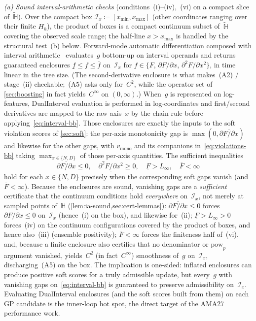 \documentclass[11pt]{article}
\newcommand{\calI}{\mathcal{I}}
\newcommand{\bbH}{\mathbb{H}}
\theoremstyle{plain}
\theoremstyle{remark}
\begin{document}
\smallskip\noindent
\emph{(a) Sound interval-arithmetic checks} (conditions~(i)--(iv),~(vi) on a compact slice of~$\widetilde{\bbH}$).
Over the compact box $\calI_x \coloneqq [x_{\min}, x_{\max}]$ (other coordinates ranging over their finite $H_h$), the product of boxes is a compact continuum subset of~$\widetilde{\bbH}$ covering the observed scale range; the half-line $x>x_{\max}$ is handled by the structural test~(b) below.
Forward-mode automatic differentiation composed with interval arithmetic~\citep{moore2009interval,kronberger2022shape} evaluates~$g$ bottom-up on interval operands and returns guaranteed enclosures
$\underline{f} \leq f \leq \overline{f}$ on~$\calI_x$ for $f \in \{F,\, \partial F/\partial x,\, \partial^2 F/\partial x^2\}$, in time linear in the tree size.
(The second-derivative enclosure is what makes~(A2) / stage~(ii) checkable;~(A5) asks only for~$C^2$, while the operator set of \cref{sec:boosting} in fact yields~$C^\infty$ on $(0,\infty)$.)
When~$g$ is represented on log-features, DualInterval evaluation is performed in log-coordinates and first/second derivatives are mapped to the raw axis~$x$ by the chain rule before applying~\eqref{eq:interval-bb}.
Those enclosures are exactly the inputs to the soft violation scores of \cref{sec:soft}: the per-axis monotonicity gap is $\max(0,\overline{\partial F/\partial x})$ and likewise for the other gaps, with $v_{\mathrm{mono}}$ and its companions in~\eqref{eq:violations-bb} taking $\max_{x\in\{N,D\}}$ of those per-axis quantities.
The sufficient inequalities
\begin{equation}\label{eq:interval-bb}
    \overline{\partial F / \partial x} \leq 0,
    \quad
    \underline{\partial^2 F / \partial x^2} \geq 0,
    \quad
    \underline{F} > L_\infty ,
    \quad
    \overline{F} < \infty
\end{equation}
hold for each $x \in \{N,D\}$ precisely when the corresponding soft gaps vanish (and $\overline{F}<\infty$).
Because the enclosures are sound, vanishing gaps are a \emph{sufficient} certificate that the continuum conditions hold \emph{everywhere} on~$\calI_x$, not merely at sampled points of~$\bbH$ (\cref{lem:ia-sound,sec:cert-lemmas}):
$\overline{\partial F/\partial x} \leq 0$ forces~$\partial F/\partial x \leq 0$ on~$\calI_x$ (hence~(i) on the box), and likewise for~(ii);
$\underline{F} > L_\infty > 0$ forces~(iv) on the continuum configurations covered by the product of boxes, and hence also~(iii) (ensemble positivity);
$\overline{F} < \infty$ forces the finiteness half of~(vi), and, because a finite enclosure also certifies that no denominator or $\mathrm{pow}_p$ argument vanished, yields~$C^2$ (in fact~$C^\infty$) smoothness of~$g$ on~$\calI_x$, discharging~(A5) on the box.
The implication is one-sided: inflated enclosures can produce positive soft scores for a truly admissible update, but every~$g$ with vanishing gaps on~\eqref{eq:interval-bb} is guaranteed to preserve admissibility on~$\calI_x$.
Evaluating DualInterval enclosures (and the soft scores built from them) on each GP candidate is the inner-loop hot spot, the direct target of the AMA27 performance work.
\end{document}
